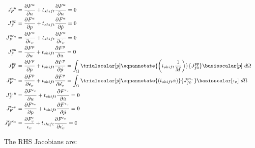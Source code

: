 \begin{align}
J_F^{uu} &= \frac{\partial F^u}{\partial u} + t_{shift} \frac{\partial F^u}{\partial \dot{u}} = 0 \\
%
J_F^{up} &= \frac{\partial F^u}{\partial p} + t_{shift} \frac{\partial F^u}{\partial \dot{p}} = 0 \\
%
J_F^{u \epsilon_{v}} &= \frac{\partial F^u}{\partial \epsilon_{v}} + t_{shift} \frac{\partial F^u}{\partial \dot{\epsilon_{v}}} = 0 \\
%
J_F^{pu} &= \frac{\partial F^p}{\partial u} + t_{shift} \frac{\partial F^p}{\partial \dot{u}} = 0 \\
J_F^{pp} &= \frac{\partial F^p}{\partial p} + t_{shift} \frac{\partial F^p}{\partial \dot{p}} = \int_{\Omega} \trialscalar[p]
\eqnannotate{\left(t_{shift} \frac{1}{M}\right)}{J_{f0}^{pp}} \basisscalar[p] \ d\Omega \\
J_F^{p\epsilon_{v}} &= \frac{\partial F^p}{\partial \epsilon_{v}} + t_{shift} \frac{\partial
F^p}{\partial \dot{\epsilon_{v}}} = \int_{\Omega} \trialscalar[p] \eqnannotate{\left(t_{shift} \alpha \right)}{J_{f0}^{p\epsilon_{v}}}
\basisscalar[\epsilon_{v}] \ d\Omega \\
%
J_F^{\epsilon_{v}u} &= \frac{\partial F^{\epsilon_{v}}}{\partial u} + t_{shift} \frac{\partial F^{\epsilon_{v}}}{\partial \dot{u}} = 0 \\
%
J_F^{\epsilon_{v}p} &= \frac{\partial F^{\epsilon_{v}}}{\partial p} + t_{shift} \frac{\partial F^{\epsilon_{v}}}{\partial \dot{p}} = 0 \\
%
J_F^{\epsilon_{v}\epsilon_{v}} &= \frac{\partial F^\epsilon_{v}}{\epsilon_{v}} + t_{shift} \frac{\partial F^{\epsilon_{v}}}{\partial \dot{\epsilon_{v}}} = 0
\end{align}

The RHS Jacobians are:

